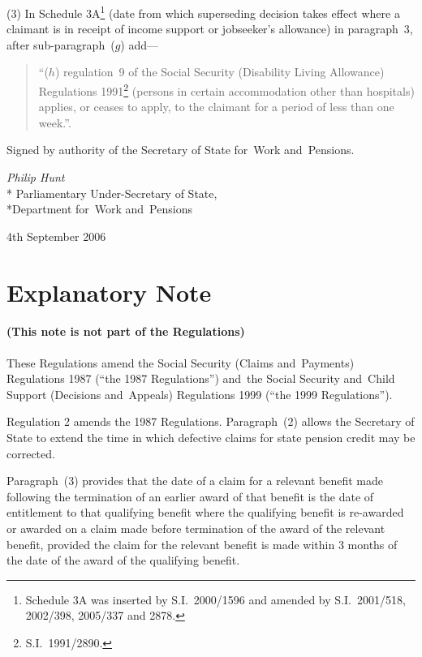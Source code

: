 \documentclass[12pt,a4paper]{article}
\begin{document}
(3) In Schedule 3A\footnote{Schedule 3A was inserted by S.I.~2000/1596 and amended by S.I.~2001/518, 2002/398, 2005/337 and 2878.} (date from which superseding decision takes effect where a claimant is in receipt of income support or jobseeker’s allowance) in paragraph~3, after sub-paragraph~($g$)  add—
\begin{quotation}
“($h$) regulation~9 of the Social Security (Disability Living Allowance) Regulations 1991\footnote{S.I.~1991/2890.} (persons in certain accommodation other than hospitals) applies, or ceases to apply, to the claimant for a period of less than one week.”.
\end{quotation}

\bigskip

Signed 
by authority of the 
Secretary of State for~Work and~Pensions.

{\raggedleft
\emph{Philip Hunt}\\*
Parliamentary Under-Secretary 
of State,\\*Department 
for~Work and~Pensions

}

4th September 2006

\small

\part{Explanatory Note}

\renewcommand\parthead{— Explanatory Note}

\subsection*{(This note is not part of the Regulations)}

These Regulations amend the Social Security (Claims and~Payments) Regulations 1987 (“the 1987 Regulations”) and~the Social Security and~Child Support (Decisions and~Appeals) Regulations 1999 (“the 1999 Regulations”).

Regulation 2 amends the 1987 Regulations. Paragraph~(2) allows the Secretary of State to extend the time in which defective claims for state pension credit may be corrected.

Paragraph~(3) provides that the date of a claim for a relevant benefit made following the termination of an earlier award of that benefit is the date of entitlement to that qualifying benefit where the qualifying benefit is re-awarded or awarded on a claim made before termination of the award of the relevant benefit, provided the claim for the relevant benefit is made within 3 months of the date of the award of the qualifying benefit.
\end{document}
